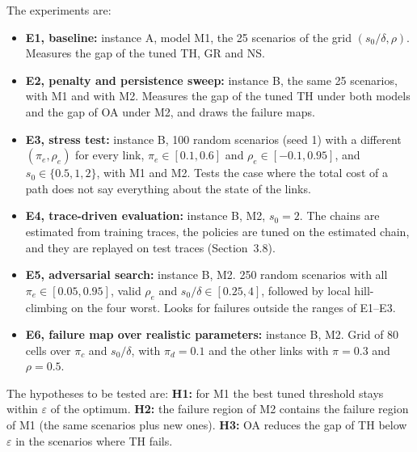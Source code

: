 \documentclass{amsart}
\begin{document}
The experiments are:
\begin{itemize}
  \item \textbf{E1, baseline:} instance A, model M1, the 25 scenarios of the grid $(s_0/\delta, \rho)$. Measures the gap of the tuned TH, GR and NS.
  \item \textbf{E2, penalty and persistence sweep:} instance B, the same 25 scenarios, with M1 and with M2. Measures the gap of the tuned TH under both models and the gap of OA under M2, and draws the failure maps.
  \item \textbf{E3, stress test:} instance B, 100 random scenarios (seed 1) with a different $(\pi_e, \rho_e)$ for every link, $\pi_e \in [0.1, 0.6]$ and $\rho_e \in [-0.1, 0.95]$, and $s_0 \in \{0.5, 1, 2\}$, with M1 and M2. Tests the case where the total cost of a path does not say everything about the state of the links.
  \item \textbf{E4, trace-driven evaluation:} instance B, M2, $s_0 = 2$. The chains are estimated from training traces, the policies are tuned on the estimated chain, and they are replayed on test traces (Section~3.8).
  \item \textbf{E5, adversarial search:} instance B, M2. 250 random scenarios with all $\pi_e \in [0.05, 0.95]$, valid $\rho_e$ and $s_0/\delta \in [0.25, 4]$, followed by local hill-climbing on the four worst. Looks for failures outside the ranges of E1--E3.
  \item \textbf{E6, failure map over realistic parameters:} instance B, M2. Grid of 80 cells over $\pi_c$ and $s_0/\delta$, with $\pi_d = 0.1$ and the other links with $\pi = 0.3$ and $\rho = 0.5$.
\end{itemize}

The hypotheses to be tested are:
\textbf{H1:} for M1 the best tuned threshold stays within $\varepsilon$ of the optimum.
\textbf{H2:} the failure region of M2 contains the failure region of M1 (the same scenarios plus new ones).
\textbf{H3:} OA reduces the gap of TH below $\varepsilon$ in the scenarios where TH fails.
\end{document}
